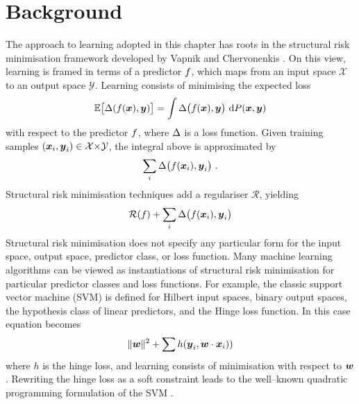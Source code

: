 \section{Background}

\newcommand\inp{\vect{x}}
\newcommand\outp{\vect{y}}

The approach to learning adopted in this chapter has roots in the
structural risk minimisation framework developed by Vapnik and
Chervonenkis \cite{Vapnik1998}. On this view, learning is framed in
terms of a predictor $\Predictor$, which maps from an input space
$\mathcal{X}$ to an output space $\mathcal{Y}$. Learning consists of
minimising the expected loss
\begin{equation}
  \label{eq:expected-utility-maximization}
  \Expected\bigl[ \Loss(f(\inp),\outp) \bigr] 
  =
  \int \Loss\bigl(\Predictor(\inp),\outp\bigr) ~ \intd P(\inp,\outp)
\end{equation}
with respect to the predictor $\Predictor$, where $\Loss$ is a loss
function. Given training samples
$(\inp_i,\outp_i)\in\mathcal{X}\cross\mathcal{Y}$, the integral above
is approximated by\changedsinceviva
\begin{equation}
  \label{eq:erm}
  \sum_i \Loss\bigl(\Predictor(\inp_i),\outp_i\bigr)~.
\end{equation}
Structural risk minimisation techniques add a regulariser
$\mathcal{R}$, yielding\changedsinceviva
\begin{equation}
  \label{eq:srm}
  \mathcal{R}(\Predictor) + \sum_i \Loss\bigl(\Predictor(\inp_i),\outp_i\bigr)
\end{equation}
Structural risk minimisation does not specify any particular form for
the input space, output space, predictor class, or loss function. Many
machine learning algorithms can be viewed as instantiations of
structural risk minimisation for particular predictor classes and loss
functions. For example, the classic support vector machine (SVM)
\cite{Cortes1995} is defined for Hilbert input spaces, binary output
spaces, the hypothesis class of linear predictors, and the Hinge loss
function. In this case equation  becomes
\begin{equation}
  \|\Model\|^2 + \sum h(\outp_i, \Model \cdot \inp_i))
\end{equation}
where $h$ is the hinge loss, and learning consists of minimisation
with respect to $\Model$. Rewriting the hinge loss as a soft
constraint leads to the well--known quadratic programming formulation
of the SVM \cite{Cortes1995}.

